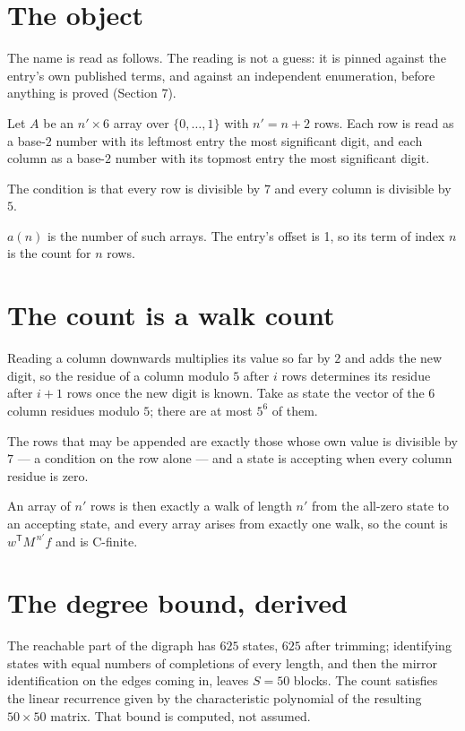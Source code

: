 \documentclass[11pt]{article}
\theoremstyle{definition}
\begin{document}
\section{The object}

The name is read as follows. The reading is not a guess: it is pinned against the entry's own published terms, and against an independent enumeration, before anything is proved (Section 7).

Let $A$ be an $n' \times 6$ array over $\{0,\dots,1\}$ with $n' = n + 2$ rows. Each row is read as a base-$2$ number with its leftmost entry the most significant digit, and each column as a base-$2$ number with its topmost entry the most significant digit.

The condition is that every row is divisible by $7$ and every column is divisible by $5$.

$a(n)$ is the number of such arrays. The entry's offset is 1, so its term of index $n$ is the count for $n$ rows.

\section{The count is a walk count}

Reading a column downwards multiplies its value so far by $2$ and adds the new digit, so the residue of a column modulo $5$ after $i$ rows determines its residue after $i+1$ rows once the new digit is known. Take as state the vector of the $6$ column residues modulo $5$; there are at most $5^{6}$ of them.

The rows that may be appended are exactly those whose own value is divisible by $7$ --- a condition on the row alone --- and a state is accepting when every column residue is zero.

An array of $n'$ rows is then exactly a walk of length $n'$ from the all-zero state to an accepting state, and every array arises from exactly one walk, so the count is $w^{\mathsf T}M^{\,n'}f$ and is C-finite.

\section{The degree bound, derived}

The reachable part of the digraph has $625$ states, $625$ after trimming; identifying states with equal numbers of completions of every length, and then the mirror identification on the edges coming in, leaves $S = 50$ blocks. The count satisfies the linear recurrence given by the characteristic polynomial of the resulting $50\times50$ matrix. That bound is computed, not assumed.
\end{document}
